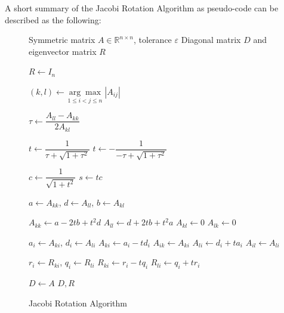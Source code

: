 \documentclass[english,notitlepage]{revtex4-1}  %
\begin{document}
A short summary of the Jacobi Rotation Algorithm as pseudo-code can be described as the following:
\begin{figure}[H]
    \begin{algorithm}[H]
        \caption{Jacobi Rotation Algorithm}
        \label{algo:Jacobi}

        \begin{algorithmic}[1]
            \Require Symmetric matrix $A \in \mathbb{R}^{n \times n}$,
                     tolerance $\varepsilon$
            \Ensure Diagonal matrix $D$ and eigenvector matrix $R$

            \State $R \gets I_n$


                \State $(k,l) \gets
                    \underset{1 \leq i < j \leq n}{\arg\max}\,
                    |A_{ij}|$

                \State $\tau \gets
                    \dfrac{A_{ll}-A_{kk}}{2A_{kl}}$

                    \Statex \hspace{\algorithmicindent}\hspace{\algorithmicindent} $t \gets
                        \dfrac{1}{\tau+\sqrt{1+\tau^2}}$
                \Else
                    \Statex \hspace{\algorithmicindent} \hspace{\algorithmicindent} $t \gets
                        -\dfrac{1}{-\tau+\sqrt{1+\tau^2}}$
                \EndIf

                \State $c \gets \dfrac{1}{\sqrt{1+t^2}}$
                \State $s \gets tc$

                \State $a \gets A_{kk}$, \quad
                       $d \gets A_{ll}$, \quad
                       $b \gets A_{kl}$

                \State $A_{kk} \gets a-2tb+t^2d$
                \State $A_{ll} \gets d+2tb+t^2a$
                \State $A_{kl} \gets 0$
                \State $A_{lk} \gets 0$

                    \State $a_i \gets A_{ki}$, \quad
                           $d_i \gets A_{li}$
                    \State $A_{ki} \gets a_i-td_i$
                    \State $A_{ik} \gets A_{ki}$
                    \State $A_{li} \gets d_i+ta_i$
                    \State $A_{il} \gets A_{li}$
                \EndFor

                    \State $r_i \gets R_{ki}$, \quad
                           $q_i \gets R_{li}$
                    \State $R_{ki} \gets r_i-tq_i$
                    \State $R_{li} \gets q_i+tr_i$
                \EndFor

            \EndWhile

            \State $D \gets A$
            \State \Return $D,R$
        \end{algorithmic}
    \end{algorithm}
\end{figure}
\end{document}
